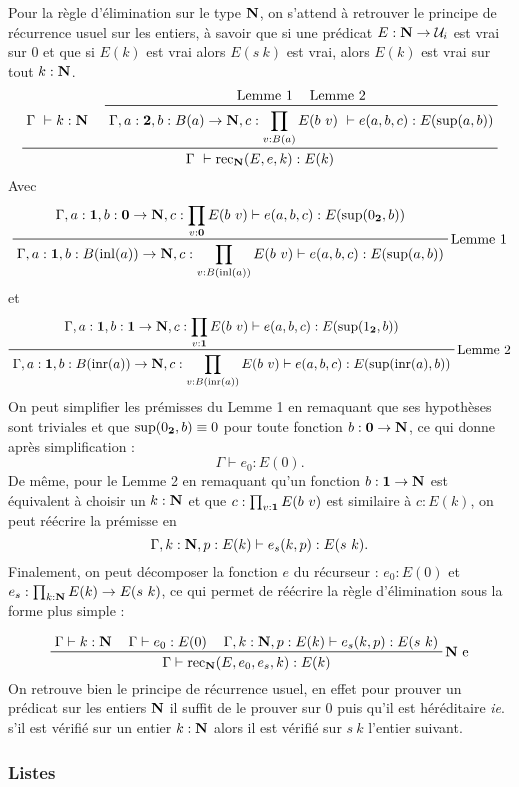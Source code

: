 \documentclass[../../rapport.tex]{subfiles}
\begin{document}
  Pour la règle d'élimination sur le type $\mathbf N$, on s'attend à retrouver le principe de récurrence usuel sur les entiers,
  à savoir que si une prédicat $E : \mathbf N \rightarrow \mathcal U_i$ est vrai sur $0$ et que si $E(k)$ est vrai alors $E(s\ k)$ est vrai,
  alors $E(k)$ est vrai sur tout $k : \mathbf N$.
  $$
  \prfinterspace=1.2em
  \prftree
    {\Gamma\ \vdash k : \N}
    {\prftree
      {\text{Lemme 1}}
      {\text{Lemme 2}}
    {\Gamma, a : \2, b : B(a) \fun \N, c : \prod_{v : B(a)}{E(b\ v)}\ \vdash e(a, b, c) : E(\sup(a, b))}}
    {\Gamma\ \vdash \rec_{\N}(E, e, k) : E(k)}
  $$
  Avec
  $$\prfinterspace=1.2em
  \prftree[r]{Lemme 1}
    {\Gamma, a : \1, b : \0 \fun \N, c : \prod_{v : \0}E(b\ v) \vdash e(a, b, c) : E(\sup(0_{\2}, b))}
  {\Gamma, a : \1, b : B(\inl(a)) \fun \N, c : \prod_{v : B(\inl(a))}E(b\ v) \vdash e(a, b, c) : E(\sup(a, b))}
  $$
  et
  $$\prfinterspace=1.2em
  \prftree[r]{Lemme 2}
  {\Gamma, a : \1, b : \1 \fun \N, c : \prod_{v : \1}E(b\ v) \vdash e(a, b, c) : E(\sup(1_{\2}, b))}
  {\Gamma, a : \1, b : B(\inr(a)) \fun \N, c : \prod_{v:B(\inr(a))}E(b\ v) \vdash e(a, b, c) : E(\sup(\inr(a), b))}
  $$
  On peut simplifier les prémisses du Lemme 1 en remaquant que ses hypothèses sont triviales et que $\sup(0_{\operatorname{\textbf{2}}}, b) \equiv 0$
  pour toute fonction $b : \operatorname{\textbf{0}} \rightarrow \mathbf N$, ce qui donne après simplification :
  $$\Gamma \vdash e_0 : E(0).$$
  De même, pour le Lemme 2 en remaquant qu'un fonction $b : \operatorname{\textbf{1}} \rightarrow \mathbf N$ est équivalent à choisir un $k : \mathbf N$ et que
  $c : \prod_{v:\operatorname{\textbf{1}}}E(b\ v)$ est similaire à $c : E(k)$, on peut réécrire la prémisse en
  $$\Gamma, k : \mathbf N, p : E(k) \vdash e_s(k, p) : E(s\ k).$$
  Finalement, on peut décomposer la fonction $e$ du récurseur : $e_0 : E(0)$ et $e_s : \prod_{k : \N}E(k) \fun E(s\ k)$,
  ce qui permet de réécrire la règle d'élimination sous la forme plus simple :

  $$\prfinterspace=1.2em
  \prftree[r]{$\N$ e}
    {\Gamma \vdash k : \N}
    {\Gamma \vdash e_0 : E(0)}
    {\Gamma, k : \N, p : E(k) \vdash e_s(k, p) : E(s\ k)}
  {\Gamma \vdash \rec_{\N}(E, e_0, e_s, k) : E(k)}
  $$
  On retrouve bien le principe de récurrence usuel, en effet pour prouver un prédicat sur les entiers $\mathbf N$
  il suffit de le prouver sur $0$ puis qu'il est héréditaire \textit{ie}. s'il est vérifié sur un entier $k : \mathbf N$
  alors il est vérifié sur $s\ k$ l'entier suivant.

  \subsubsection{Listes}
\end{document}
